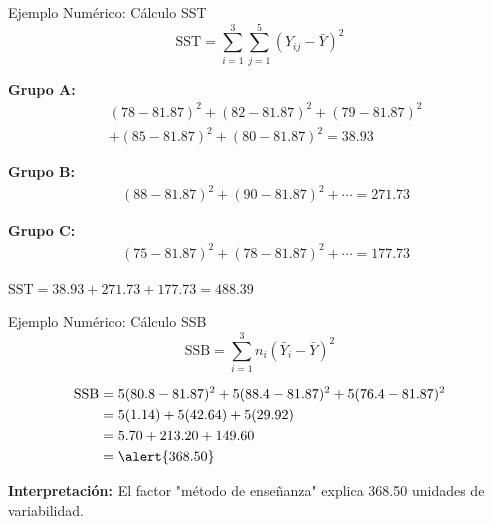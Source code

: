 \documentclass[10pt,aspectratio=169]{beamer}
\begin{document}
\begin{frame}{Ejemplo Numérico: Cálculo SST}
\begin{equation*}
\text{SST} = \sum_{i=1}^{3} \sum_{j=1}^{5} (Y_{ij} - \bar{Y})^2
\end{equation*}

\vspace{0.3cm}

\textbf{Grupo A:}
\begin{align*}
&(78-81.87)^2 + (82-81.87)^2 + (79-81.87)^2 \\
&+ (85-81.87)^2 + (80-81.87)^2 = 38.93
\end{align*}

\textbf{Grupo B:}
\begin{align*}
&(88-81.87)^2 + (90-81.87)^2 + \cdots = 271.73
\end{align*}

\textbf{Grupo C:}
\begin{align*}
&(75-81.87)^2 + (78-81.87)^2 + \cdots = 177.73
\end{align*}

\vspace{0.2cm}
\alert{$\text{SST} = 38.93 + 271.73 + 177.73 = 488.39$}
\end{frame}

\begin{frame}{Ejemplo Numérico: Cálculo SSB}
\begin{equation*}
\text{SSB} = \sum_{i=1}^{3} n_i (\bar{Y}_i - \bar{Y})^2
\end{equation*}

\vspace{0.5cm}

\begin{align*}
\text{SSB} &= 5(80.8 - 81.87)^2 + 5(88.4 - 81.87)^2 + 5(76.4 - 81.87)^2 \\
&= 5(1.14) + 5(42.64) + 5(29.92) \\
&= 5.70 + 213.20 + 149.60 \\
&= \alert{368.50}
\end{align*}

\vspace{0.3cm}

\textbf{Interpretación:} El factor "método de enseñanza" explica 368.50 unidades de variabilidad.
\end{frame}
\end{document}
